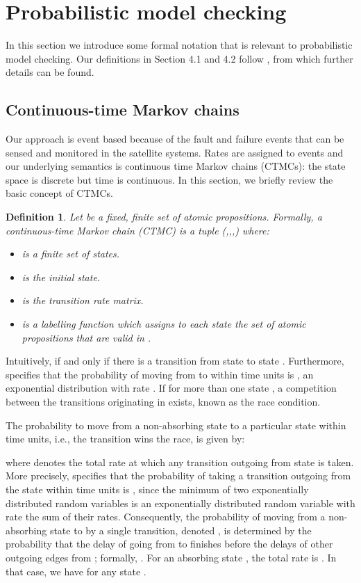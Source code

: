 \documentclass[preprint,12pt]{qrei}
\newtheorem{mydef}{Definition}
\begin{document}
\section{Probabilistic model checking}\label{sect:pmc}

In this section we introduce some formal notation that is relevant to probabilistic model checking. Our definitions in Section 4.1 and 4.2 follow \cite{BK08}, from which further details can be found.

\subsection{Continuous-time Markov chains}

Our approach is event based because of the fault and failure events that can be sensed and monitored in the satellite systems. Rates are assigned to events and our underlying semantics is continuous time Markov chains (CTMCs): the state space is discrete but time is continuous. In this section, we briefly review the basic concept of CTMCs.

\begin{mydef}\label{def:ctmc}
Let  be a fixed, finite set of atomic propositions. Formally, a continuous-time Markov chain (CTMC)  is a tuple (,,,) where:
\begin{itemize}
\item  is a finite set of states.
\item  is the initial state.
\item  is the transition rate matrix.
\item  is a labelling function which assigns to each state  the set  of atomic propositions  that are valid in .
\end{itemize}
\end{mydef}

Intuitively,  if and only if there is a transition from state  to state . Furthermore,  specifies that the probability of moving from  to  within  time units is , an exponential distribution with rate . If  for more than one state , a competition between the transitions originating in  exists, known as the race condition. 

The probability to move from a non-absorbing state  to a particular state  within  time units, i.e., the transition  wins the race, is given by:



\noindent where  denotes the total rate at which any transition outgoing from state  is taken. More precisely,  specifies that the probability of taking a transition outgoing from the state  within  time units is , since the minimum of two exponentially distributed random variables is an exponentially distributed random variable with rate the sum of their rates. Consequently, the probability of moving from a non-absorbing state  to  by a single transition, denoted , is determined by the probability that the delay of going from  to  finishes before the delays of other outgoing edges from ; formally, . For an absorbing state , the total rate is . In that case, we have  for any state .
\end{document}
